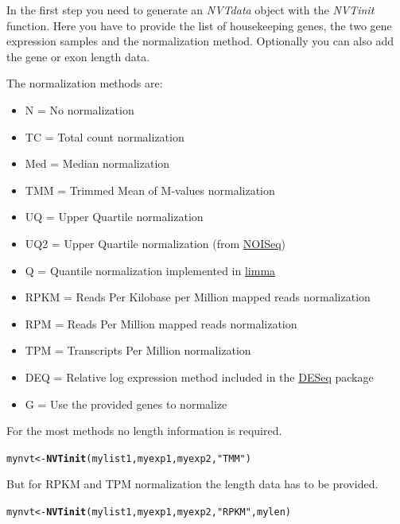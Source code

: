 \documentclass[11pt]{article}\usepackage[]{graphicx}\usepackage[usenames,dvipsnames]{color}
\makeatletter
\newcommand{\hlstr}[1]{\textcolor[rgb]{0.192,0.494,0.8}{#1}}%
\newcommand{\hlstd}[1]{\textcolor[rgb]{0.345,0.345,0.345}{#1}}%
\newcommand{\hlkwb}[1]{\textcolor[rgb]{0.69,0.353,0.396}{#1}}%
\newcommand{\hlkwd}[1]{\textcolor[rgb]{0.737,0.353,0.396}{\textbf{#1}}}%
\newenvironment{kframe}{%
 \def\at@end@of@kframe{}%
 \ifinner\ifhmode%
  \def\at@end@of@kframe{\end{minipage}}%
  \begin{minipage}{\columnwidth}%
 \fi\fi%
 \def\FrameCommand##1{\hskip\@totalleftmargin \hskip-\fboxsep
 \colorbox{shadecolor}{##1}\hskip-\fboxsep
     \hskip-\linewidth \hskip-\@totalleftmargin \hskip\columnwidth}%
 \MakeFramed {\advance\hsize-\width
   \@totalleftmargin\z@ \linewidth\hsize
   \@setminipage}}%
 {\par\unskip\endMakeFramed%
 \at@end@of@kframe}
\newenvironment{knitrout}{}{} %
\makeatother
\begin{document}
In the first step you need to generate an \textit{NVTdata} object with the \textit{NVTinit} function. Here you have to provide the list of housekeeping genes, the two gene expression samples and the normalization method. Optionally you can also add the gene or exon length data.

The normalization methods are:
\begin{itemize}
 \item N = No normalization
 \item TC = Total count normalization
 \item Med = Median normalization
 \item TMM = Trimmed Mean of M-values normalization
 \item UQ = Upper Quartile normalization
 \item UQ2 = Upper Quartile normalization (from \href{https://www.bioconductor.org/packages/release/bioc/html/NOISeq.html}{NOISeq}\cite{tarazona2011})
 \item Q = Quantile normalization implemented in \href{https://bioconductor.org/packages/release/bioc/html/limma.html}{limma}\cite{ritchie2015}
 \item RPKM = Reads Per Kilobase per Million mapped reads normalization
 \item RPM = Reads Per Million mapped reads normalization
 \item TPM = Transcripts Per Million normalization
 \item DEQ = Relative log expression method included in the \href{https://www.bioconductor.org/packages/release/bioc/html/DESeq.html}{DESeq}\cite{anders2010} package
 \item G = Use the provided genes to normalize
\end{itemize}

For the most methods no length information is required.

\begin{knitrout}
\color{fgcolor}\begin{kframe}
\begin{alltt}
\hlstd{mynvt} \hlkwb{<-} \hlkwd{NVTinit}\hlstd{(mylist1,myexp1,myexp2,}\hlstr{"TMM"}\hlstd{)}
\end{alltt}
\end{kframe}
\end{knitrout}

But for RPKM and TPM normalization the length data has to be provided.

\begin{knitrout}
\color{fgcolor}\begin{kframe}
\begin{alltt}
\hlstd{mynvt} \hlkwb{<-} \hlkwd{NVTinit}\hlstd{(mylist1,myexp1,myexp2,}\hlstr{"RPKM"}\hlstd{,mylen)}
\end{alltt}
\end{kframe}
\end{knitrout}
\end{document}
